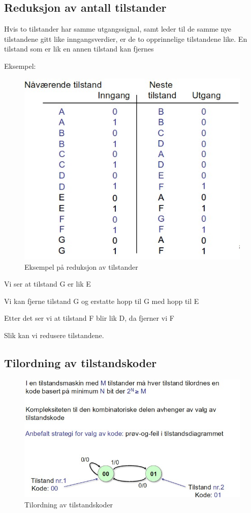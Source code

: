 \documentclass{article}
\begin{document}
	\subsection{Reduksjon av antall tilstander}
	 Hvis to tilstander har samme utgangssignal, samt leder til de samme nye tilstandene gitt like inngangsverdier,
	 er de to opprinnelige tilstandene like. En tilstand som er lik en annen tilstand kan fjernes
	 
	 Eksempel:
	 \begin{figure}[H]
	 	\includegraphics[scale = 0.6]{red.jpg}
	 	\caption{Eksempel på reduksjon av tilstander}
	 \end{figure}
	 
	 Vi ser at tilstand G er lik E
	 
	 Vi kan fjerne tilstand G og erstatte hopp til G med hopp til E
	 
	 Etter det ser vi at tilstand F blir lik D, da fjerner vi F
	 
	 Slik kan vi redusere tilstandene.
	 
	 	
	\subsection{Tilordning av tilstandskoder}
	\begin{figure}[H]
		\includegraphics[scale = 0.6]{tilordning.jpg}
		\caption{Tilordning av tilstandskoder}
	\end{figure}
	
\end{document}
